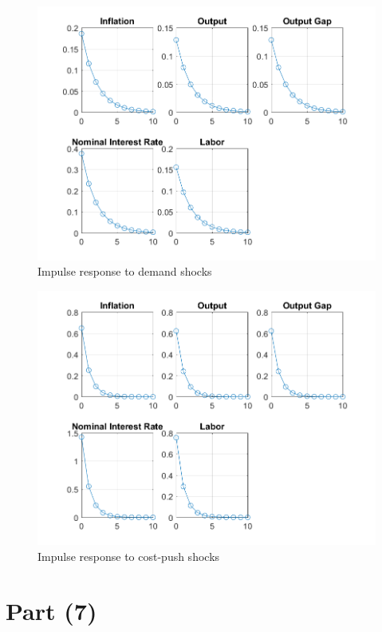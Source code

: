 \documentclass[12pt]{article}
\theoremstyle{definition}
\begin{document}
\begin{figure}[H]
	\centering
	\includegraphics[width=\linewidth, height=0.4\textheight]{impulse_demand}
	\caption{Impulse response to demand shocks}
	\label{fig:impulse_demand}
\end{figure}
\begin{figure}[H]
	\centering
	\includegraphics[width=\linewidth, height=0.4\textheight]{impulse_cost}
	\caption{Impulse response to cost-push shocks}
	\label{fig:impulse_cost}
\end{figure}

\section*{Part (7)}
\end{document}
